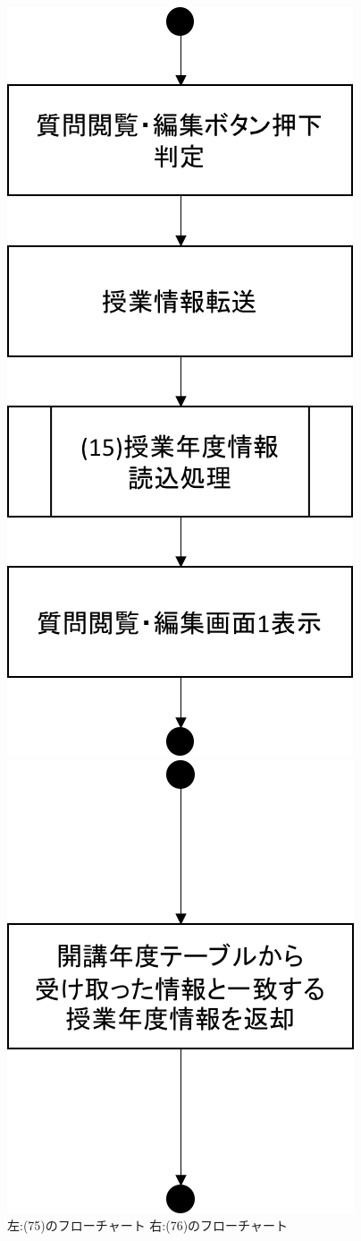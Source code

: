 \begin{figure}[htbp]
 \begin{minipage}{0.5\hsize}
  \begin{center}
   \includegraphics[width=0.5\linewidth,clip]{./img/flow/75.png}
  \end{center}
 \end{minipage}
 \begin{minipage}{0.5\hsize}
  \begin{center}
   \includegraphics[width=0.5\linewidth,clip]{./img/flow/76.png}
  \end{center}
 \end{minipage}
 \caption{左:(75)のフローチャート 右:(76)のフローチャート}\label{fig:75to76}
\end{figure}

